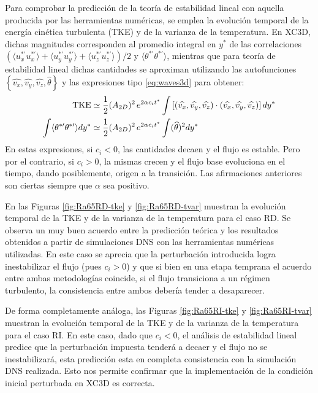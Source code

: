 Para comprobar la predicción de la teoría de estabilidad lineal con aquella producida por las herramientas numéricas, se emplea la evolución temporal de la energía cinética turbulenta (TKE) y de la varianza de la temperatura. En XC3D, dichas magnitudes corresponden al promedio integral en $y^*$ de las correlaciones $( \langle u^{* \prime}_x u^{* \prime}_x \rangle + \langle u^{* \prime}_y u^{* \prime}_y  \rangle + \langle u^{* \prime}_z u^{* \prime}_z  \rangle) / 2$ y $\langle \theta^{* \prime} \theta^{* \prime} \rangle$, mientras que para teoría de estabilidad lineal dichas cantidades se aproximan utilizando las autofunciones $\left\lbrace \widehat{v_x}, \widehat{v_y}, \widehat{v_z}, \widehat{\theta} \right\rbrace$ y las expresiones tipo \ref{eq:waves3d} para obtener:
\begin{align}
\text{TKE} &\simeq \frac{1}{2} (A_{2D})^2 \hspace*{0.5mm} e^{2 \alpha c_i t^*} \int \left[  ( \widehat{v_x}, \widehat{v_y}, \widehat{v_z} ) \cdot ( \widehat{v_x}, \widehat{v_y}, \widehat{v_z} )  \right] dy^* \\
\int \langle \theta^{* \prime} \theta^{* \prime} \rangle dy^* &\simeq \frac{1}{2} (A_{2D})^2 \hspace*{0.5mm} e^{2 \alpha c_i t^*} \int (\widehat{\theta})^2 dy^*
\end{align}   
En estas expresiones, si $c_i < 0$, las cantidades decaen y el flujo es estable. Pero por el contrario, si $c_i > 0$, la mismas crecen y el flujo base evoluciona en el tiempo, dando posiblemente, origen a la transición. Las afirmaciones anteriores son ciertas siempre que $\alpha$ sea positivo.

En las Figuras \ref{fig:Ra65RD-tke} y \ref{fig:Ra65RD-tvar} muestran la evolución temporal de la TKE y de la varianza de la temperatura para el caso RD. Se observa un muy buen acuerdo entre la predicción teórica y los resultados obtenidos a partir de simulaciones DNS con las herramientas numéricas utilizadas. En este caso se aprecia que la perturbación introducida logra inestabilizar el flujo (pues $c_i>0$) y que si bien en una etapa temprana el acuerdo entre ambas metodologías coincide, si el flujo transiciona a un régimen turbulento, la consistencia entre ambos debería tender a desaparecer.  

De forma completamente análoga, las Figuras \ref{fig:Ra65RI-tke} y \ref{fig:Ra65RI-tvar} muestran la evolución temporal de la TKE y de la varianza de la temperatura para el caso RI. En este caso, dado que $c_i<0$, el análisis de estabilidad lineal predice que la perturbación impuesta tenderá a decaer y el flujo no se inestabilizará, esta predicción esta en completa consistencia con la simulación DNS realizada. Esto nos permite confirmar que la implementación de la condición inicial perturbada en XC3D es correcta.  

